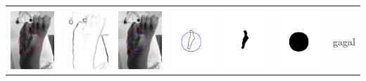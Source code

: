\begin{table}[H]
\begin{tabular}{|m{0.7in}|m{0.7in}|m{0.7in}|m{0.7in}|m{0.7in}|m{0.7in}|m{0.7in}|}
		&  &  & & & &  \\
		\includegraphics[width=0.7in]{dataset/dataset_3/luka_merah/ready/3_integer_init.jpg}&
		\includegraphics[width=0.7in]{dataset/dataset_3/luka_merah/ready/3_integer_ext.jpg}&
		\includegraphics[width=0.7in]{dataset/dataset_3/luka_merah/ready/3_integer_result.jpg}&
		\includegraphics[width=0.7in]{dataset/dataset_3/luka_merah/ready/3_gt_r_integer.jpg}&
		\includegraphics[width=0.7in]{dataset/dataset_3/luka_merah/ready/3_r.jpg}&
		\includegraphics[width=0.7in]{dataset/dataset_3/luka_merah/ready/3_integer_r.jpg}&
		gagal\\
		\hline
		

\end{tabular}
\end{table}
